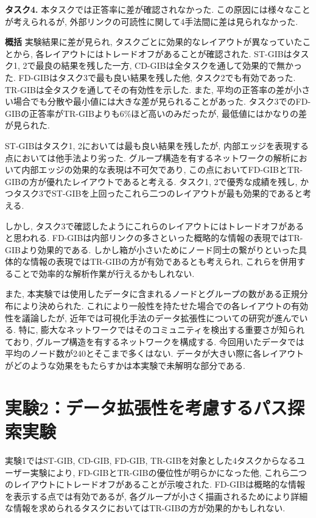 \documentclass{kuee}
\begin{document}
{\bf タスク4.} 本タスクでは正答率に差が確認されなかった.
この原因には様々なことが考えられるが, 外部リンクの可読性に関して4手法間に差は見られなかった.

{\bf 概括} 実験結果に差が見られ, タスクごとに効果的なレイアウトが異なっていたことから, 各レイアウトにはトレードオフがあることが確認された.
ST-GIBはタスク1, 2で最良の結果を残した一方, CD-GIBは全タスクを通して効果的で無かった.
FD-GIBはタスク3で最も良い結果を残した他, タスク2でも有効であった.
TR-GIBは全タスクを通してその有効性を示した.
また, 平均の正答率の差が小さい場合でも分散や最小値には大きな差が見られることがあった.
タスク3でのFD-GIBの正答率がTR-GIBよりも6\%ほど高いのみだったが, 最低値にはかなりの差が見られた.

ST-GIBはタスク1, 2においては最も良い結果を残したが, 内部エッジを表現する点においては他手法より劣った.
グループ構造を有するネットワークの解析において内部エッジの効果的な表現は不可欠であり, この点においてFD-GIBとTR-GIBの方が優れたレイアウトであると考える.
タスク1, 2で優秀な成績を残し, かつタスク3でST-GIBを上回ったこれら二つのレイアウトが最も効果的であると考える.

しかし, タスク3で確認したようにこれらのレイアウトにはトレードオフがあると思われる.
FD-GIBは内部リンクの多さといった概略的な情報の表現ではTR-GIBより効果的である.
しかし箱が小さいためにノード同士の繋がりといった具体的な情報の表現ではTR-GIBの方が有効であるとも考えられ, これらを併用することで効率的な解析作業が行えるかもしれない.

また, 本実験では使用したデータに含まれるノードとグループの数がある正規分布により決められた.
これにより一般性を持たせた場合での各レイアウトの有効性を議論したが, 近年では可視化手法のデータ拡張性についての研究が進んでいる.
特に, 膨大なネットワークではそのコミュニティを検出する重要さが知られており\cite{girvan2002community,newman2004detecting}, グループ構造を有するネットワークを構成する.
今回用いたデータでは平均のノード数が240とそこまで多くはない.
データが大きい際に各レイアウトがどのような効果をもたらすかは本実験で未解明な部分である.

\chapter{実験2：データ拡張性を考慮するパス探索実験}
\label{chap:ex_2}

実験1ではST-GIB, CD-GIB, FD-GIB, TR-GIBを対象とした4タスクからなるユーザー実験により, FD-GIBとTR-GIBの優位性が明らかになった他, これら二つのレイアウトにトレードオフがあることが示唆された.
FD-GIBは概略的な情報を表示する点では有効であるが, 各グループが小さく描画されるためにより詳細な情報を求められるタスクにおいてはTR-GIBの方が効果的かもしれない.
\end{document}
